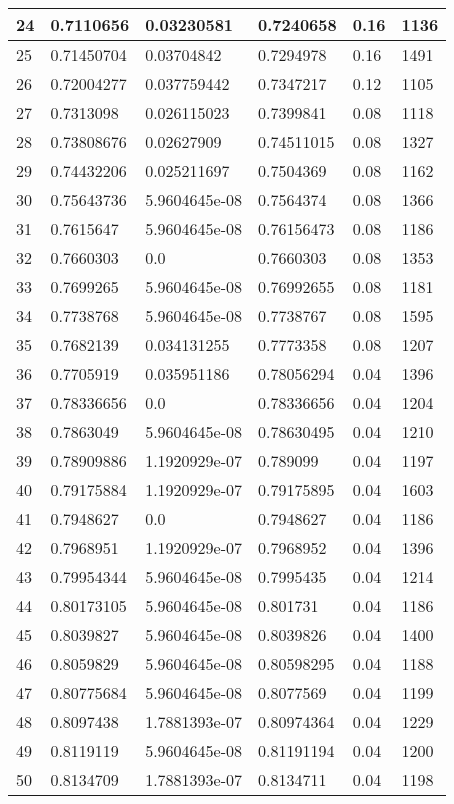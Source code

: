 \begin{longtable}{|l|l|l|l|l|l|}
24 & 0.7110656 & 0.03230581 & 0.7240658 & 0.16 & 1136 \\ \hline 
25 & 0.71450704 & 0.03704842 & 0.7294978 & 0.16 & 1491 \\ \hline 
26 & 0.72004277 & 0.037759442 & 0.7347217 & 0.12 & 1105 \\ \hline 
27 & 0.7313098 & 0.026115023 & 0.7399841 & 0.08 & 1118 \\ \hline 
28 & 0.73808676 & 0.02627909 & 0.74511015 & 0.08 & 1327 \\ \hline 
29 & 0.74432206 & 0.025211697 & 0.7504369 & 0.08 & 1162 \\ \hline 
30 & 0.75643736 & 5.9604645e-08 & 0.7564374 & 0.08 & 1366 \\ \hline 
31 & 0.7615647 & 5.9604645e-08 & 0.76156473 & 0.08 & 1186 \\ \hline 
32 & 0.7660303 & 0.0 & 0.7660303 & 0.08 & 1353 \\ \hline 
33 & 0.7699265 & 5.9604645e-08 & 0.76992655 & 0.08 & 1181 \\ \hline 
34 & 0.7738768 & 5.9604645e-08 & 0.7738767 & 0.08 & 1595 \\ \hline 
35 & 0.7682139 & 0.034131255 & 0.7773358 & 0.08 & 1207 \\ \hline 
36 & 0.7705919 & 0.035951186 & 0.78056294 & 0.04 & 1396 \\ \hline 
37 & 0.78336656 & 0.0 & 0.78336656 & 0.04 & 1204 \\ \hline 
38 & 0.7863049 & 5.9604645e-08 & 0.78630495 & 0.04 & 1210 \\ \hline 
39 & 0.78909886 & 1.1920929e-07 & 0.789099 & 0.04 & 1197 \\ \hline 
40 & 0.79175884 & 1.1920929e-07 & 0.79175895 & 0.04 & 1603 \\ \hline 
41 & 0.7948627 & 0.0 & 0.7948627 & 0.04 & 1186 \\ \hline 
42 & 0.7968951 & 1.1920929e-07 & 0.7968952 & 0.04 & 1396 \\ \hline 
43 & 0.79954344 & 5.9604645e-08 & 0.7995435 & 0.04 & 1214 \\ \hline 
44 & 0.80173105 & 5.9604645e-08 & 0.801731 & 0.04 & 1186 \\ \hline 
45 & 0.8039827 & 5.9604645e-08 & 0.8039826 & 0.04 & 1400 \\ \hline 
46 & 0.8059829 & 5.9604645e-08 & 0.80598295 & 0.04 & 1188 \\ \hline 
47 & 0.80775684 & 5.9604645e-08 & 0.8077569 & 0.04 & 1199 \\ \hline 
48 & 0.8097438 & 1.7881393e-07 & 0.80974364 & 0.04 & 1229 \\ \hline 
49 & 0.8119119 & 5.9604645e-08 & 0.81191194 & 0.04 & 1200 \\ \hline 
50 & 0.8134709 & 1.7881393e-07 & 0.8134711 & 0.04 & 1198 \\ \hline 
\end{longtable}